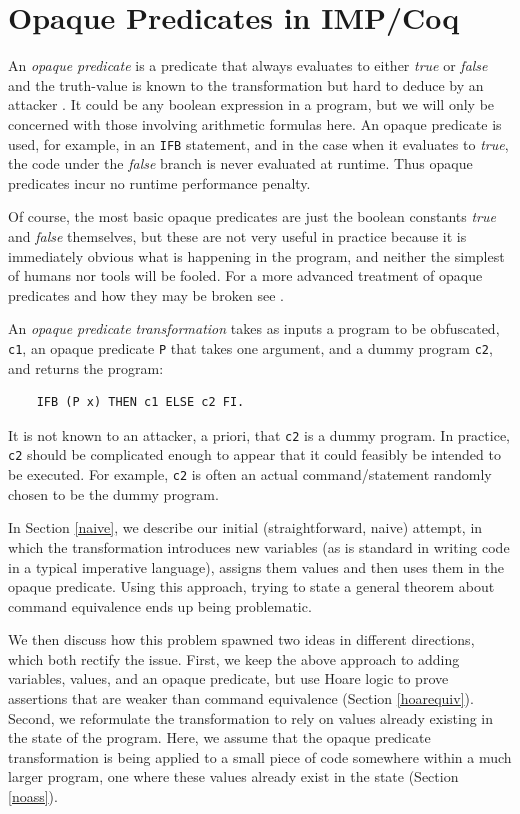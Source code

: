 \documentclass[compsoc,conference,a4paper,10pt,times]{IEEEtran}
\begin{document}
\section{Opaque Predicates in IMP/Coq}
\label{sec:opaque}
An \emph{opaque predicate} \cite{CoNa} is a predicate that always evaluates to either \emph{true} or \emph{false} and the truth-value is known to the transformation but hard to deduce by an attacker \cite{Prada}. It could be any boolean expression in a program, but we will only be concerned with those involving arithmetic formulas here. An opaque predicate is used, for example, in an \texttt{IFB} statement, and in the case when it evaluates to \emph{true}, the code under the \emph{false} branch is never evaluated at runtime.  Thus opaque predicates incur no runtime performance penalty.

Of course, the most basic opaque predicates are just the boolean constants \emph{true} and \emph{false} themselves, but these are not very useful in practice because it is immediately obvious what is happening in the program, and neither the simplest of humans nor tools will be fooled. For a more advanced treatment of opaque predicates and how they may be broken see \cite{Prada}.

An \emph{opaque predicate transformation} takes as inputs a program to be obfuscated, \texttt{c1}, an opaque predicate \texttt{P} that takes one argument, and a dummy program \texttt{c2}, and returns the program:
\begin{verbatim}
    IFB (P x) THEN c1 ELSE c2 FI.
\end{verbatim}
It is not known to an attacker, a priori, that \texttt{c2} is a dummy program. In practice, \texttt{c2} should be complicated enough to appear that it could feasibly be intended to be executed. For example, \texttt{c2} is often an actual command/statement randomly chosen to be the dummy program.

In Section \ref{naive}, we describe our initial (straightforward, naive) attempt, in which the transformation introduces new variables (as is standard in writing code in a typical imperative language), assigns them values and then uses them in the opaque predicate.  Using this approach, trying to state a general theorem about command equivalence ends up being problematic.  

We then discuss how this problem spawned two ideas in different directions, which both rectify the issue. First, we keep the above approach to adding variables, values, and an opaque predicate, but use Hoare logic to prove assertions that are weaker than command equivalence (Section \ref{hoarequiv}).
Second, we reformulate the transformation to rely on values already existing in the state of the program. Here, we assume that the opaque predicate transformation is being applied to a small piece of code somewhere within a much larger program, one where these values already exist in the state (Section \ref{noass}).
\end{document}
